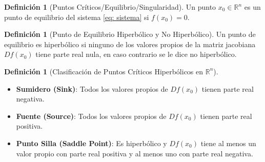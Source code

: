 \documentclass[12pt,letterpaper,oneside]{book}
\theoremstyle{definition}
\newtheorem{definicion}[teorema]{Definición}
\theoremstyle{remark}
\begin{document}
	\begin{definicion}[Puntos Críticos/Equilibrio/Singularidad]
		Un punto $x_0 \in \mathbb{R}^n$ es un punto de equilibrio del sistema \eqref{eq: sistema} si $f(x_0) = 0$.
	\end{definicion}
	
	\begin{definicion}[Punto de Equilibrio Hiperbólico y No Hiperbólico]
		Un punto de equilibrio es hiperbólico si ninguno de los valores propios de la matriz jacobiana $Df(x_0)$ tiene parte real nula, en caso contrario se le dice no hiperbólico.
	\end{definicion}
	
	\begin{definicion}[Clasificación de Puntos Críticos Hiperbólicos en $\mathbb{R}^n$] \
		\begin{itemize}
			\item \textbf{Sumidero (Sink)}: Todos los valores propios de $Df(x_0)$ tienen parte real negativa.
			\item \textbf{Fuente (Source)}: Todos los valores propios de $Df(x_0)$ tienen parte real positiva.
			\item \textbf{Punto Silla (Saddle Point)}: Es hiperbólico y $Df(x_0)$ tiene al menos un valor propio con parte real positiva y al menos uno con parte real negativa.
		\end{itemize}
	\end{definicion}
	
\end{document}
